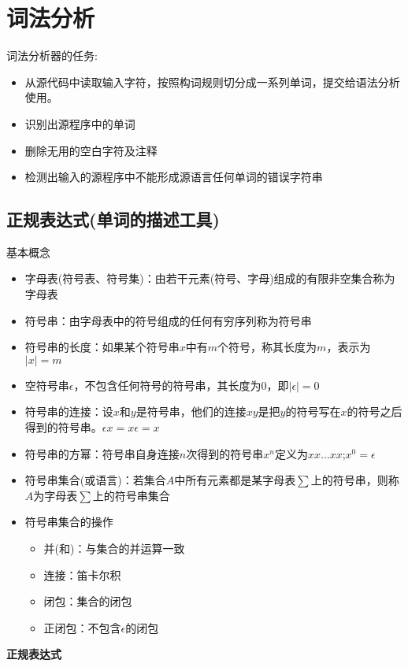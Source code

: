 \documentclass[utf8]{ctexart}
\begin{document}
\section{词法分析}
\noindent 词法分析器的任务:
\begin{itemize}
    \item 从源代码中读取输入字符，按照构词规则切分成一系列单词，提交给语法分析使用。
    \item 识别出源程序中的单词
    \item 删除无用的空白字符及注释
    \item 检测出输入的源程序中不能形成源语言任何单词的错误字符串
\end{itemize}

\subsection{正规表达式(单词的描述工具)}
\noindent 基本概念
\begin{itemize}
    \item 字母表(符号表、符号集)：由若干元素(符号、字母)组成的有限非空集合称为字母表
    \item 符号串：由字母表中的符号组成的任何有穷序列称为符号串
    \item 符号串的长度：如果某个符号串$x$中有$m$个符号，称其长度为$m$，表示为$|x|=m$
    \item 空符号串$\epsilon$，不包含任何符号的符号串，其长度为0，即$|\epsilon|=0$
    \item 符号串的连接：设$x$和$y$是符号串，他们的连接$xy$是把$y$的符号写在$x$的符号之后得到的符号串。$\epsilon x=x\epsilon=x$
    \item 符号串的方幂：符号串自身连接$n$次得到的符号串$x^n$定义为$xx \dots xx$;$x^0 = \epsilon$
    \item 符号串集合(或语言)：若集合$A$中所有元素都是某字母表$\sum$上的符号串，则称$A$为字母表$\sum$上的符号串集合
    \item 符号串集合的操作
    \begin{itemize}
        \item 并(和)：与集合的并运算一致
        \item 连接：笛卡尔积
        \item 闭包：集合的闭包
        \item 正闭包：不包含$\epsilon$的闭包
    \end{itemize}
\end{itemize}

\noindent \textbf{正规表达式}
\end{document}
